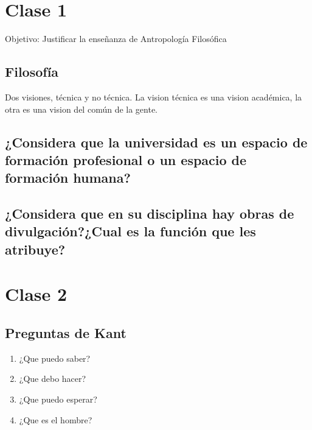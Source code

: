     \tableofcontents

    \chapter{Clase 1}
    Objetivo: Justificar la enseñanza de Antropología Filosófica\\
    \section{Filosofía}
    Dos visiones, técnica y no técnica. La vision técnica es una vision académica, la otra es una vision del común de la gente.\\
    \section{¿Considera que la universidad es un espacio de formación profesional o un espacio de formación humana?}
    \section{¿Considera que en su disciplina hay obras de divulgación?¿Cual es la función que les atribuye?}

    \chapter{Clase 2}
    \section{Preguntas de Kant}
    \begin{enumerate}
        \item ¿Que puedo saber?

        \item ¿Que debo hacer?

        \item ¿Que puedo esperar?

        \item ¿Que es el hombre?
    \end{enumerate}

